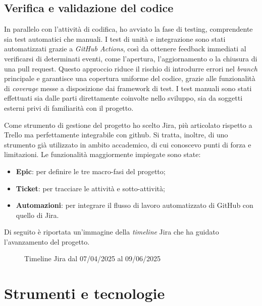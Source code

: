 \subsection{Verifica e validazione del codice}

\par In parallelo con l’attività di codifica, ho avviato la fase di testing, comprendente sia test automatici che manuali. I test di unità e integrazione sono stati automatizzati grazie a \textit{GitHub Actions}, così da ottenere feedback immediati al verificarsi di determinati eventi, come l’apertura, l’aggiornamento o la chiusura di una \gls{pull request}. Questo approccio riduce il rischio di introdurre errori nel \textit{branch} principale e garantisce una copertura uniforme del codice, grazie alle funzionalità di \textit{coverage} messe a disposizione dai \gls{framework} di test. I test manuali sono stati effettuati sia dalle parti direttamente coinvolte nello sviluppo, sia da soggetti esterni privi di familiarità con il progetto.

\vspace{10pt}
\par\noindent Come strumento di gestione del progetto ho scelto Jira, più articolato rispetto a Trello ma perfettamente integrabile con \gls{github}. Si tratta, inoltre, di uno strumento già utilizzato in ambito accademico, di cui conoscevo punti di forza e limitazioni. Le funzionalità maggiormente impiegate sono state:
\begin{itemize}
  \item \textbf{Epic}: per definire le tre macro-fasi del progetto;
  \item \textbf{Ticket}: per tracciare le attività e sotto-attività;
  \item \textbf{Automazioni}: per integrare il flusso di lavoro automatizzato di GitHub con quello di Jira.
\end{itemize}

\vspace{5pt}
\par\noindent Di seguito è riportata un’immagine della \textit{timeline} Jira che ha guidato l’avanzamento del progetto.

\begin{figure}[H]
  \centering 
  \caption{Timeline Jira dal 07/04/2025 al 09/06/2025}
\end{figure}

\section{Strumenti e tecnologie}
\label{sec:strumenti-tecnologie}

